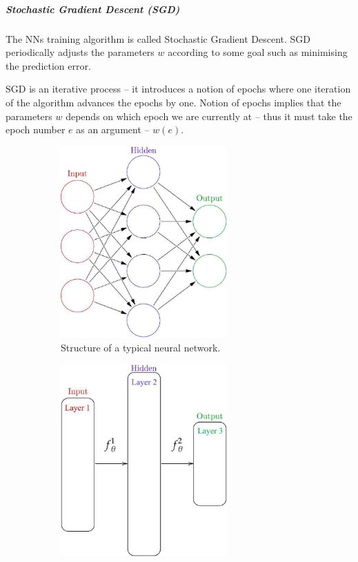 \documentclass[dissertation.tex]{subfiles}
\begin{document}
\subparagraph{Stochastic Gradient Descent (SGD)} The NNs training algorithm is
called Stochastic Gradient Descent. SGD periodically adjusts the parameters $w$
according to some goal such as minimising the prediction error. 

SGD is an iterative process -- it introduces a notion of epochs where one
iteration of the algorithm advances the epochs by one. Notion of epochs implies
that the parameters $w$ depends on which epoch we are currently at -- thus it
must take the epoch number $e$ as an argument -- $w(e)$.


\begin{figure}[H]
  \centering
  \begin{subfigure}[t]{0.49\textwidth}
    \centering
    \includegraphics[width=0.7\textwidth]{figs/neural_network.jpg}
    \caption{
      Structure of a typical neural network.
    }
    \label{fig:nnOriginal}
  \end{subfigure}
  \hfill
  \begin{subfigure}[t]{0.49\textwidth}
    \centering
    \includegraphics[width=0.7\textwidth]{figs/neural_network_abstraction.jpg}

\end{subfigure}
\end{figure}
\end{document}
